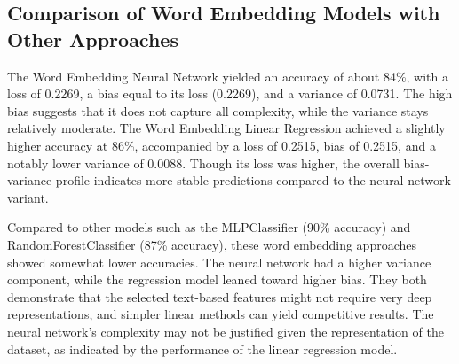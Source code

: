 \subsection{Comparison of Word Embedding Models with Other Approaches}
The Word Embedding Neural Network yielded an accuracy of about 84\%, with a loss of 0.2269, a bias equal to its loss (0.2269), and a variance of 0.0731. The high bias suggests that it does not capture all complexity, while the variance stays relatively moderate. The Word Embedding Linear Regression achieved a slightly higher accuracy at 86\%, accompanied by a loss of 0.2515, bias of 0.2515, and a notably lower variance of 0.0088. Though its loss was higher, the overall bias-variance profile indicates more stable predictions compared to the neural network variant.

Compared to other models such as the MLPClassifier (90\% accuracy) and RandomForestClassifier (87\% accuracy), these word embedding approaches showed somewhat lower accuracies. The neural network had a higher variance component, while the regression model leaned toward higher bias. They both demonstrate that the selected text-based features might not require very deep representations, and simpler linear methods can yield competitive results. The neural network's complexity may not be justified given the representation of the dataset, as indicated by the performance of the linear regression model.